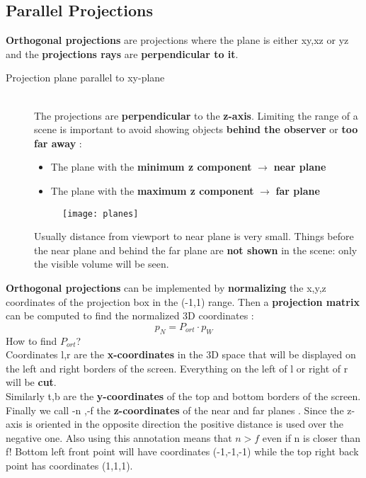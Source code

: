 \subsection{Parallel Projections}
\textbf{Orthogonal projections} are projections where the plane is either xy,xz or yz and the \textbf{projections rays} are \textbf{perpendicular to it}.
\begin{description}
\item[Projection plane parallel to xy-plane]\hfill\\
The projections are \textbf{perpendicular} to the \textbf{z-axis}.
Limiting the range of a scene is important to avoid showing objects \textbf{behind the observer} or \textbf{too far away} :
\begin{itemize}
\item The plane with the \textbf{minimum z component } $\to$ \textbf{near plane}
\item The plane with the \textbf{maximum z component } $\to$ \textbf{far plane}
\end{itemize}
\begin{figure}[H]
 \centering
  \texttt{[image: planes]}
\end{figure}
Usually distance from viewport to near plane is very small. Things before the near plane and behind the far plane are \textbf{not shown} in the scene: only the visible volume will be seen.\\
\end{description}
\textbf{Orthogonal projections} can be implemented by \textbf{normalizing} the x,y,z coordinates of the projection box in the (-1,1) range. Then a \textbf{projection matrix} can be computed to find the normalized 3D coordinates :
$$ p_N = P_{ort}\cdot p_W$$
How to find $P_{ort} $?\\
Coordinates l,r are the \textbf{x-coordinates} in the 3D space that will be displayed on the left and right borders of the screen. Everything on the left of l or right of r will be \textbf{cut}.\\
Similarly t,b are the \textbf{y-coordinates} of the top and bottom borders of the screen.\\ 
Finally we call -n ,-f the \textbf{z-coordinates} of the near and far planes . Since the z-axis is oriented in the opposite direction the positive distance is used over the negative one. Also using this annotation means that $n>f$ even if n is closer than f!
Bottom left front point will have coordinates (-1,-1,-1) while the top right back point has coordinates (1,1,1).\\
